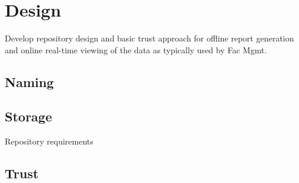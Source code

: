 \section{Design}

Develop repository design and basic trust approach for offline report generation and online real-time viewing of the data as typically used by Fac Mgmt. 

\subsection{Naming}
\subsection{Storage}
Repository requirements
\subsection{Trust}
